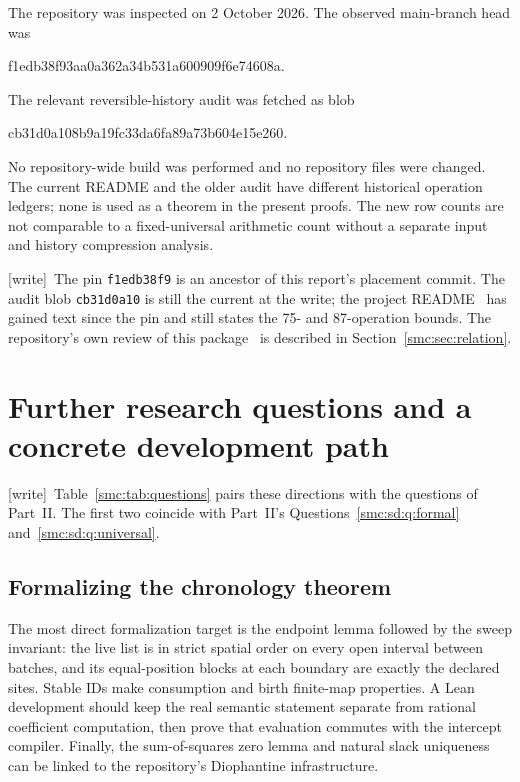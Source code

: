 \documentclass[11pt,letterpaper]{article}
\numberwithin{equation}{section}
\theoremstyle{definition}
\theoremstyle{remark}
\newcommand{\wtag}{\textup{[write]}}
\begin{document}
The repository was inspected on 2 October 2026. The observed main-branch
head was
\begin{center}\small\ttfamily
f1edb38f93aa0a362a34b531a600909f6e74608a.
\end{center}
The relevant reversible-history audit was fetched as blob
\begin{center}\small\ttfamily
cb31d0a108b9a19fc33da6fa89a73b604e15e260.
\end{center}
No repository-wide build was performed and no repository files were changed.
The current README and the older audit have different historical operation
ledgers; none is used as a theorem in the present proofs. The new row counts
are not comparable to a fixed-universal arithmetic count without a separate
input and history compression analysis.


\wtag\ The pin \texttt{f1edb38f9} is an ancestor of this report's placement commit. The audit blob \texttt{cb31d0a10} is still the current  at the write; the project README~\cite{repo} has gained text since the pin and still states the 75- and 87-operation bounds. The repository's own review of this package~\cite{reviewsignal} is described in Section~\ref{smc:sec:relation}.

\section{Further research questions and a concrete development path}
\label{smc:cg:sec:future}

\wtag\ Table~\ref{smc:tab:questions} pairs these directions with the questions of Part~II. The first two coincide with Part~II's Questions~\ref{smc:sd:q:formal} and~\ref{smc:sd:q:universal}.

\subsection{Formalizing the chronology theorem}\label{smc:cg:q:formal}

The most direct formalization target is the endpoint lemma followed by the
sweep invariant: the live list is in strict spatial order on every open
interval between batches, and its equal-position blocks at each boundary
are exactly the declared sites. Stable IDs make consumption and birth
finite-map properties. A Lean development should keep the real semantic
statement separate from rational coefficient computation, then prove that
evaluation commutes with the intercept compiler. Finally, the sum-of-squares
zero lemma and natural slack uniqueness can be linked to the repository's
Diophantine infrastructure.
\end{document}
